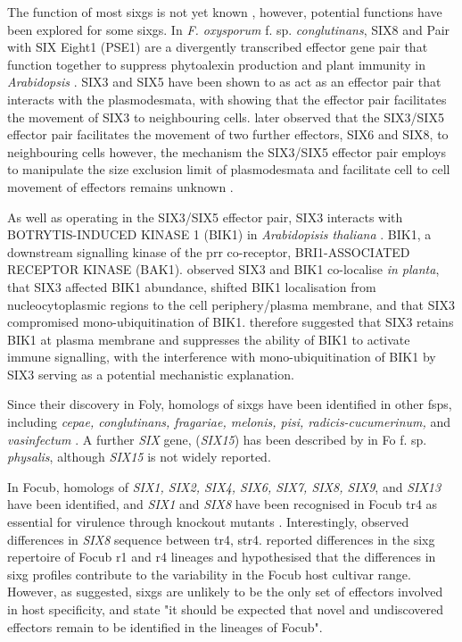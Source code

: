 The function of most \acp{sixg} is not yet known \parencite{Czislowski2018, An2019, jobe2024secreted, daniel2024structural}, however, potential functions have been explored for some \acp{sixg}. In \textit{F. oxysporum} f. sp. \textit{conglutinans}, SIX8 and Pair with SIX Eight1 (PSE1) are a divergently transcribed effector gene pair that function together to suppress phytoalexin production and plant immunity in \textit{Arabidopsis} \parencite{ayukawa2021pair}. SIX3 and SIX5 have been shown to as act as an effector pair that interacts with the plasmodesmata, with \textcite{cao2018fusarium} showing that the effector pair facilitates the movement of SIX3 to neighbouring cells. \textcite{blekemolen2022primary} later observed that the SIX3/SIX5 effector pair facilitates the movement of two further effectors, SIX6 and SIX8, to neighbouring cells however, the mechanism the SIX3/SIX5 effector pair employs to manipulate the size exclusion limit of plasmodesmata and facilitate cell to cell movement of effectors remains unknown \parencite{blekemolen2022primary}. 

As well as operating in the SIX3/SIX5 effector pair, SIX3 interacts with BOTRYTIS-INDUCED KINASE 1 (BIK1) in \textit{Arabidopisis thaliana} \parencite{blekemolen2023pti}. BIK1, a downstream signalling kinase of the \acf{prr} co-receptor, BRI1-ASS\-OCIATED RECEPTOR KINASE (BAK1). \textcite{blekemolen2023pti} observed SIX3 and BIK1 co-localise \textit{in planta}, that SIX3 affected BIK1 abundance, shifted BIK1 localisation from nucleocytoplasmic regions to the cell periphery/plasma membrane, and that SIX3 compromised mono-ubiquitination of BIK1. \textcite{blekemolen2023pti} therefore suggested that SIX3 retains BIK1 at plasma membrane and suppresses the ability of BIK1 to activate immune signalling, with the interference with mono-ubiquitination of BIK1 by SIX3 serving as a potential mechanistic explanation. 

Since their discovery in \ac{Foly}, homologs of \acp{sixg} have been identified in other \acp{fsp}, including \textit{cepae, conglutinans, fragariae, melonis, pisi, radicis-cucumerinum,} and \textit{vasinfectum} \parencite{Czislowski2018}. A further \textit{SIX} gene, (\textit{SIX15}) has been described by \textcite{Simbaqueba2018} in \acl{Fo} f. sp. \textit{physalis}, although \textit{SIX15} is not widely reported. 

In \ac{Focub}, homologs of \textit{SIX1, SIX2, SIX4, SIX6, SIX7, SIX8, SIX9}, and \textit{SIX13} have been identified, and \textit{SIX1} and \textit{SIX8} have been recognised in \ac{Focub} \ac{tr4} as essential for virulence through knockout mutants \parencite{Widinugraheni2018, An2019}. Interestingly, \textcite{Fraser-smith2014} observed differences in \textit{SIX8} sequence between \ac{tr4}, \ac{str4}. \textcite{Czislowski2018} reported differences in the \ac{sixg} repertoire of \ac{Focub} \ac{r1} and \ac{r4} lineages and hypothesised that the differences in \ac{sixg} profiles contribute to the variability in the \ac{Focub} host cultivar range.  However, as suggested, \acp{sixg} are unlikely to be the only set of effectors involved in host specificity, and  \textcite{Czislowski2018} state "it should be expected that novel and undiscovered effectors remain to be identified in the lineages of \ac{Focub}".  

